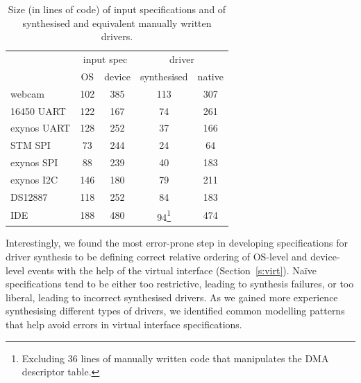 \begin{table}
    \begin{minipage}{\linewidth}
    \center
    \begin{tabular}{|l|c|c|c|c|}
        \hline
        & \multicolumn{2}{|c|}{input spec} & \multicolumn{2}{c|}{driver} \\
        \cline{2-5}
                     & OS  & device & synthesised & native \\
        \hline
        \hline
        webcam       & 102 & 385    & 113         & 307 \\
        16450 UART   & 122 & 167    & 74          & 261 \\
        exynos UART  & 128 & 252    & 37          & 166 \\
        STM SPI      & 73  & 244    & 24          & 64  \\
        exynos SPI   & 88  & 239    & 40          & 183 \\
        exynos I2C   & 146 & 180    & 79          & 211 \\
        DS12887      & 118 & 252    & 84          & 183 \\
        IDE          & 188 & 480    & 94\footnote{Excluding 36 lines of manually written code that manipulates the DMA descriptor table.} & 474 \\
        \hline
    \end{tabular}
    \end{minipage}
    \caption{Size (in lines of code) of input specifications and of synthesised and equivalent manually written drivers.}
    \label{t:size}
\end{table}

Interestingly, we found the most error-prone step in developing specifications for driver synthesis to be defining correct relative ordering of OS-level and device-level events with the help of the virtual interface (Section~\ref{s:virt}).  Na\"ive specifications tend to be either too restrictive, leading to synthesis failures, or too liberal, leading to incorrect synthesised drivers. As we gained more experience synthesising different types of drivers, we identified common modelling patterns that help avoid errors in virtual interface specifications.  

